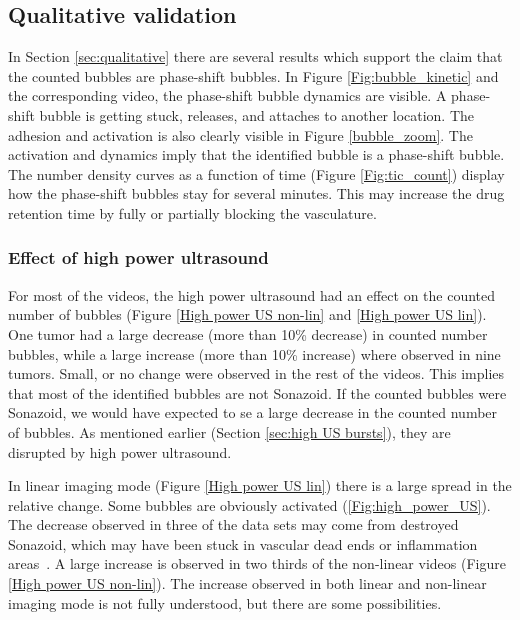 \subsection{Qualitative validation}
In Section \ref{sec:qualitative} there are several results which support the claim that the counted bubbles are phase-shift bubbles. In Figure \ref{Fig:bubble_kinetic} and the corresponding video, the phase-shift bubble dynamics are visible. A phase-shift bubble is getting stuck, releases, and attaches to another location. The adhesion and activation is also clearly visible in Figure \ref{bubble_zoom}. The activation and dynamics imply that the identified bubble is a phase-shift bubble. The number density curves as a function of time (Figure \ref{Fig:tic_count}) display how the phase-shift bubbles stay for several minutes. This may increase the drug retention time by fully or partially blocking the vasculature.

\subsubsection{Effect of high power ultrasound} 
For most of the videos, the high power ultrasound had an effect on the counted number of bubbles (Figure \ref{High power US non-lin} and \ref{High power US lin}). One tumor had a large decrease (more than 10\% decrease) in counted number bubbles, while a large increase (more than 10\% increase)  where observed in nine tumors. Small, or no change were observed in the rest of the videos. This implies that most of the identified bubbles are not Sonazoid\texttrademark{}. If the counted bubbles were Sonazoid\texttrademark{}, we would have expected to se a large decrease in the counted number of bubbles. As mentioned earlier (Section \ref{sec:high US bursts}), they are disrupted by high power ultrasound.

In linear imaging mode (Figure \ref{High power US lin}) there is a large spread in the relative change. Some bubbles are obviously activated (\ref{Fig:high_power_US}). The decrease observed in three of the data sets may come from destroyed Sonazoid\texttrademark{}, which may have been stuck in vascular dead ends or inflammation areas~\cite{Healey_pc}. A large increase is observed in two thirds of the non-linear videos (Figure \ref{High power US non-lin}). The increase observed in both linear and non-linear imaging mode is not fully understood, but there are some possibilities. 


